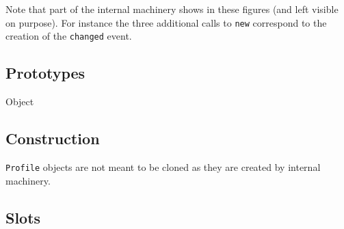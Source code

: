 Note that part of the internal machinery shows in these figures (and left
visible on purpose).  For instance the three additional calls to
\lstinline{new} correspond to the creation of the \lstinline{changed} event.

\subsection{Prototypes}

\begin{refObjects}
\item[Object]
\end{refObjects}

\subsection{Construction}

\lstinline|Profile| objects are not meant to be cloned as they are created
by  internal machinery.

\subsection{Slots}

